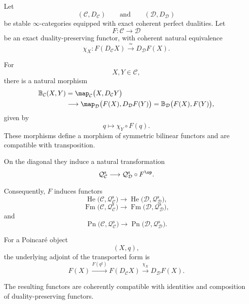 \begin{proposition}
\label{prop:functoriality-homotopy-symmetric-structures}
Let
\[
    (\mathcal C,D_{\mathcal C})
    \qquad\text{and}\qquad
    (\mathcal D,D_{\mathcal D})
\]
be stable $\infty$-categories equipped with exact coherent perfect
dualities. Let
\[
    F
    \colon
    \mathcal C
    \longrightarrow
    \mathcal D
\]
be an exact duality-preserving functor, with coherent natural equivalence
\[
    \chi_X
    \colon
    F(D_{\mathcal C}X)
    \xrightarrow{\;\simeq\;}
    D_{\mathcal D}F(X).
\]

For
\[
    X,Y\in\mathcal C,
\]
there is a natural morphism
\[
\begin{aligned}
    \mathbb B_{\mathcal C}(X,Y)
    &=
    \map_{\mathcal C}
    \bigl(
        X,
        D_{\mathcal C}Y
    \bigr)
    \\
    &\longrightarrow
    \map_{\mathcal D}
    \bigl(
        F(X),
        D_{\mathcal D}F(Y)
    \bigr)
    =
    \mathbb B_{\mathcal D}
    \bigl(
        F(X),
        F(Y)
    \bigr),
\end{aligned}
\]
given by
\[
    q
    \longmapsto
    \chi_Y\circ F(q).
\]
These morphisms define a morphism of symmetric bilinear functors and are
compatible with transposition.

On the diagonal they induce a natural transformation
\[
    \mathcal Q_{\mathcal C}^{\mathrm s}
    \longrightarrow
    \mathcal Q_{\mathcal D}^{\mathrm s}
    \circ
    F^{\op}.
\]

Consequently, $F$ induces functors
\[
    \operatorname{He}
    \bigl(
        \mathcal C,
        \mathcal Q_{\mathcal C}^{\mathrm s}
    \bigr)
    \longrightarrow
    \operatorname{He}
    \bigl(
        \mathcal D,
        \mathcal Q_{\mathcal D}^{\mathrm s}
    \bigr),
\]
\[
    \operatorname{Fm}
    \bigl(
        \mathcal C,
        \mathcal Q_{\mathcal C}^{\mathrm s}
    \bigr)
    \longrightarrow
    \operatorname{Fm}
    \bigl(
        \mathcal D,
        \mathcal Q_{\mathcal D}^{\mathrm s}
    \bigr),
\]
and
\[
    \operatorname{Pn}
    \bigl(
        \mathcal C,
        \mathcal Q_{\mathcal C}^{\mathrm s}
    \bigr)
    \longrightarrow
    \operatorname{Pn}
    \bigl(
        \mathcal D,
        \mathcal Q_{\mathcal D}^{\mathrm s}
    \bigr).
\]

For a Poincaré object
\[
    (X,q),
\]
the underlying adjoint of the transported form is
\[
    F(X)
    \xrightarrow{F(q^\sharp)}
    F(D_{\mathcal C}X)
    \xrightarrow{\chi_X}
    D_{\mathcal D}F(X).
\]

The resulting functors are coherently compatible with identities and
composition of duality-preserving functors.
\end{proposition}

